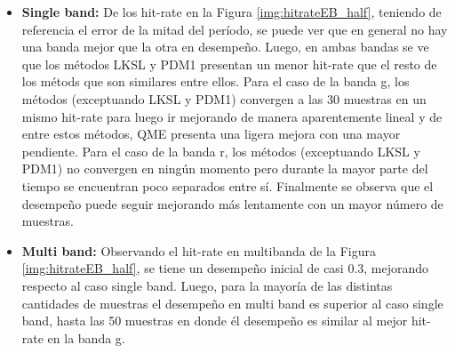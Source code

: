     	
    	\begin{itemize}
    	    \item \textbf{Single band:} De los hit-rate en la Figura \ref{img:hitrateEB_half}, teniendo de referencia el error de la mitad del período, se puede ver que en general no hay una banda mejor que la otra en desempeño. Luego, en ambas bandas se ve que los métodos LKSL y PDM1 presentan un menor hit-rate que el resto de los métods que son similares entre ellos. Para el caso de la banda g, los métodos (exceptuando LKSL y PDM1) convergen a las 30 muestras en un mismo hit-rate para luego ir mejorando de manera aparentemente lineal y de entre estos métodos, QME presenta una ligera mejora con una mayor pendiente. Para el caso de la banda r, los métodos (exceptuando LKSL y PDM1) no convergen en ningún momento pero durante la mayor parte del tiempo se encuentran poco separados entre sí. Finalmente se observa que el desempeño puede seguir mejorando más lentamente con un mayor número de muestras.
    	    
    	    \item \textbf{Multi band:}  Observando el hit-rate en multibanda de la Figura \ref{img:hitrateEB_half}, se tiene un desempeño inicial de casi 0.3, mejorando respecto al caso single band. Luego, para la mayoría de las distintas cantidades de muestras el desempeño en multi band es superior al caso single band, hasta las 50 muestras en donde él desempeño es similar al mejor hit-rate en la banda g.
    	\end{itemize}    	
    	
    	

